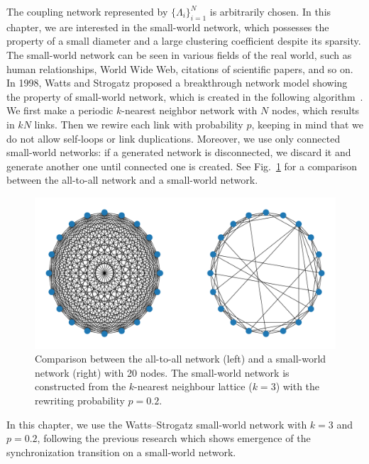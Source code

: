 The coupling network represented by $\{\Lambda_{i}\}_{i=1}^{N}$
is arbitrarily chosen. In this chapter, we are interested in
the small-world network,
which possesses the property of a small diameter and a large clustering
coefficient despite its sparsity.
The small-world network can be seen in various fields of the real world,
such as human relationships, World Wide Web, citations of scientific papers,
and so on.
In 1998, Watts and Strogatz proposed a breakthrough network model showing the property of small-world network,
which is created in the following algorithm~\cite{watts1998}.
We first make a periodic $k$-nearest neighbor network with $N$ nodes, which results in $kN$ links.
Then we rewire each link with probability $p$,
keeping in mind that we do not allow self-loops or link duplications.
Moreover, we use only connected small-world networks:
if a generated network is disconnected,
we discard it and generate another one until connected one is created.
See Fig.~\ref{fig:all-sw} for a comparison between the all-to-all network
and a small-world network.
\begin{figure}[htbp]
  \begin{center}
    \includegraphics[width=\textwidth]{figs/small_world_all_comparison.pdf}
    \caption{Comparison between the all-to-all network (left) and a small-world network (right) with 20 nodes. 
    The small-world network is constructed from the $k$-nearest neighbour lattice ($k=3$) with the rewriting probability $p=0.2$.}
    \label{fig:all-sw}
  \end{center}
\end{figure}
In this chapter,
we use the Watts--Strogatz small-world network with
$k=3$ and $p=0.2$, following the previous research \cite{hong2002}
which shows emergence of the synchronization transition
on a small-world network.



